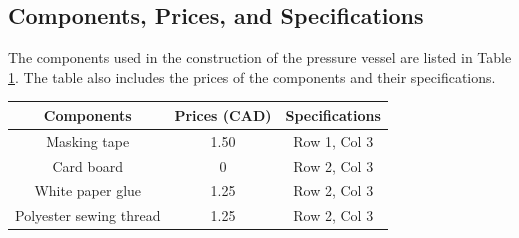 \documentclass[12pt, titlepage]{article}
\begin{document}
\subsection{Components, Prices, and Specifications}
The components used in the construction of the pressure vessel are listed in
Table \ref{tab:components}. The table also includes the prices of the components
and their specifications.
\begin{table}[htb]
    \centering
    \begin{tabular}{ccc}
        \toprule
        Components & Prices (CAD) & Specifications \\
        \midrule
        Masking tape & 1.50 & Row 1, Col 3 \\
        Card board & 0 & Row 2, Col 3 \\
        White paper glue & 1.25 & Row 2, Col 3 \\
        Polyester sewing thread & 1.25 & Row 2, Col 3 \\
        \bottomrule
    \end{tabular}
    \label{tab:components}
\end{table}
\newpage
\end{document}
